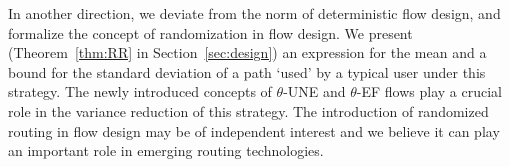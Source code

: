 In another direction, we deviate from the norm of deterministic flow design, and formalize the concept of randomization in flow design. We present (Theorem~\ref{thm:RR} in Section~\ref{sec:design}) an expression for the mean and a bound for the standard deviation of a path `used' by a typical user under this strategy.  The newly introduced concepts of $\theta$-UNE and $\theta$-EF flows play a crucial role in the variance reduction of this strategy.  The introduction of randomized routing in flow design may be of independent interest and we believe it can play an important role in emerging routing technologies. 



